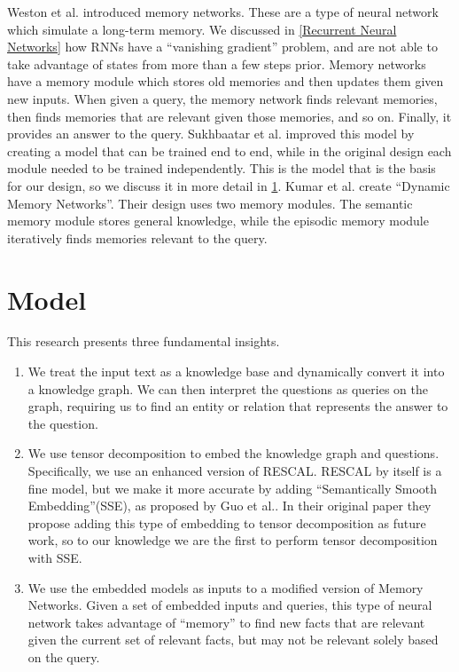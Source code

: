 \documentclass[pageno]{jpaper}
\begin{document}
Weston et al.\cite{Weston2015a} introduced memory networks. These are a type of
neural network which simulate a long-term memory. We discussed in \ref{Recurrent
Neural Networks} how RNNs have a ``vanishing gradient'' problem, and are not
able to take advantage of states from more than a few steps prior. Memory
networks have a memory module which stores old memories and then updates them
given new inputs. When given a query, the memory network finds relevant
memories, then finds memories that are relevant given those memories, and so on.
Finally, it provides an answer to the query. Sukhbaatar et
al.\cite{Sukhbaatar2015} improved this model by creating a model that can be
trained end to end, while in the original design each module needed to be
trained independently. This is the model that is the basis for our design, so we
discuss it in more detail in \ref{Model}. Kumar et al.\cite{Kumar2015} create
``Dynamic Memory Networks''. Their design uses two memory modules. The semantic
memory module stores general knowledge, while the episodic memory module
iteratively finds memories relevant to the query.

\section{Model}
\label{Model}

This research presents three fundamental insights. \\

\begin{enumerate}

    \item We treat the input text as a knowledge base and dynamically convert it
    into a knowledge graph. We can then interpret the questions as queries on
    the graph, requiring us to find an entity or relation that represents the
    answer to the question. \\

    \item We use tensor decomposition to embed the knowledge graph and
    questions. Specifically, we use an enhanced version of
    RESCAL\cite{Nickel2011}. RESCAL by itself is a fine model, but we make it
    more accurate by adding ``Semantically Smooth Embedding''(SSE), as proposed
    by Guo et al.\cite{Guo2015}. In their original paper they propose adding
    this type of embedding to tensor decomposition as future work, so to our
    knowledge we are the first to perform tensor decomposition with SSE. \\

    \item We use the embedded models as inputs to a modified version of Memory
    Networks. Given a set of embedded inputs and queries, this type of neural
    network takes advantage of ``memory'' to find new facts that are relevant
    given the current set of relevant facts, but may not be relevant solely
    based on the query. \\

\end{enumerate}
\end{document}
